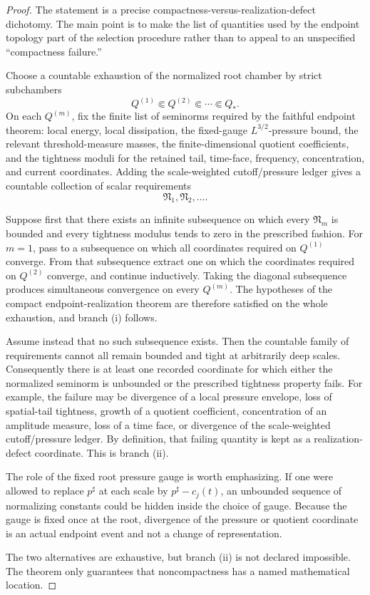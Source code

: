 \documentclass[11pt]{article}
\theoremstyle{definition}\newtheorem{problem}[theorem]{Problem}
\theoremstyle{definition}
\theoremstyle{remark}
\begin{document}
\begin{proof}
The statement is a precise compactness-versus-realization-defect dichotomy.
The main point is to make the list of quantities used by the endpoint topology
part of the selection procedure rather than to appeal to an unspecified
``compactness failure.''

Choose a countable exhaustion of the normalized root chamber by strict
subchambers
\[
 Q^{(1)}\Subset Q^{(2)}\Subset\cdots\Subset Q_*.
\]
On each \(Q^{(m)}\), fix the finite list of seminorms required by the faithful
endpoint theorem: local energy, local dissipation, the fixed-gauge
\(L^{3/2}\)-pressure bound, the relevant threshold-measure masses, the
finite-dimensional quotient coefficients, and the tightness moduli for the
retained tail, time-face, frequency, concentration, and current coordinates.
Adding the scale-weighted cutoff/pressure ledger gives a countable collection
of scalar requirements
\[
 \mathfrak N_1,\mathfrak N_2,\ldots .
\]

Suppose first that there exists an infinite subsequence on which every
\(\mathfrak N_m\) is bounded and every tightness modulus tends to zero in the
prescribed fashion.  For \(m=1\), pass to a subsequence on which all coordinates
required on \(Q^{(1)}\) converge.  From that subsequence extract one on which the
coordinates required on \(Q^{(2)}\) converge, and continue inductively.  Taking
the diagonal subsequence produces simultaneous convergence on every
\(Q^{(m)}\).  The hypotheses of the compact endpoint-realization theorem are
therefore satisfied on the whole exhaustion, and branch (i) follows.

Assume instead that no such subsequence exists.  Then the countable family of
requirements cannot all remain bounded and tight at arbitrarily deep scales.
Consequently there is at least one recorded coordinate for which either the
normalized seminorm is unbounded or the prescribed tightness property fails.
For example, the failure may be divergence of a local pressure envelope, loss
of spatial-tail tightness, growth of a quotient coefficient, concentration of
an amplitude measure, loss of a time face, or divergence of the
scale-weighted cutoff/pressure ledger.  By definition, that failing quantity is
kept as a realization-defect coordinate.  This is branch (ii).

The role of the fixed root pressure gauge is worth emphasizing.  If one were
allowed to replace \(p^\sharp\) at each scale by \(p^\sharp-c_j(t)\), an
unbounded sequence of normalizing constants could be hidden inside the choice
of gauge.  Because the gauge is fixed once at the root, divergence of the
pressure or quotient coordinate is an actual endpoint event and not a change
of representation.

The two alternatives are exhaustive, but branch (ii) is not declared
impossible.  The theorem only guarantees that noncompactness has a named
mathematical location.
\end{proof}
\end{document}

